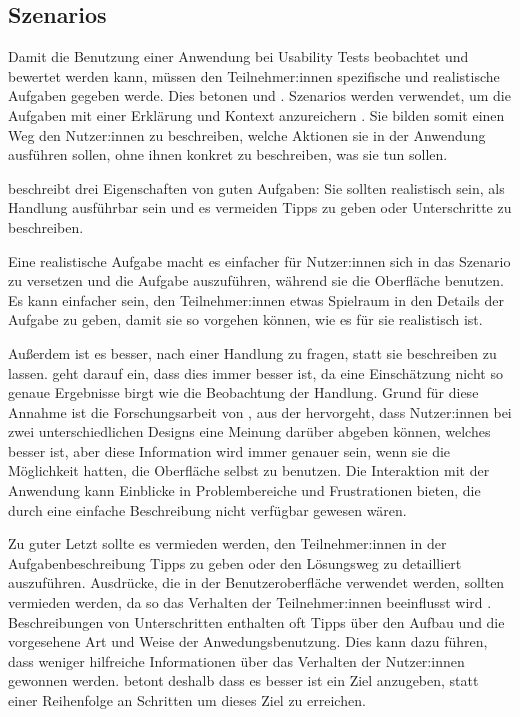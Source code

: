 \subsection{Szenarios}

Damit die Benutzung einer Anwendung bei Usability Tests beobachtet und bewertet werden kann, müssen
den Teilnehmer:innen spezifische und realistische Aufgaben gegeben werde. Dies betonen
\textcite{mccloskeyTaskScenarios2014} und \textcite{barnumUsabilityTesting2021}. Szenarios werden
verwendet, um die Aufgaben mit einer Erklärung und Kontext anzureichern
\parencite{mccloskeyTaskScenarios2014}. Sie bilden somit einen Weg den Nutzer:innen zu beschreiben,
welche Aktionen sie in der Anwendung ausführen sollen, ohne ihnen konkret zu beschreiben, was sie
tun sollen.

\textcite{mccloskeyTaskScenarios2014} beschreibt drei Eigenschaften von guten Aufgaben: Sie sollten
realistisch sein, als Handlung ausführbar sein und es vermeiden Tipps zu geben oder Unterschritte zu
beschreiben.

Eine realistische Aufgabe macht es einfacher für Nutzer:innen sich in das Szenario zu versetzen und
die Aufgabe auszuführen, während sie die Oberfläche benutzen. Es kann einfacher sein, den
Teilnehmer:innen etwas Spielraum in den Details der Aufgabe zu geben, damit sie so vorgehen können,
wie es für sie realistisch ist.
\parencite{mccloskeyTaskScenarios2014}

Außerdem ist es besser, nach einer Handlung zu fragen, statt sie beschreiben zu lassen.
\textcite{nielsenFirstRule2001} geht darauf ein, dass dies immer besser ist, da eine Einschätzung
nicht so genaue Ergebnisse birgt wie die Beobachtung der Handlung. Grund für diese Annahme ist die
Forschungsarbeit von \textcite{nielsenMeasuringUsability1994}, aus der hervorgeht, dass Nutzer:innen
bei zwei unterschiedlichen Designs eine Meinung darüber abgeben können, welches besser ist, aber
diese Information wird immer genauer sein, wenn sie die Möglichkeit hatten, die Oberfläche selbst zu
benutzen. Die Interaktion mit der Anwendung kann Einblicke in Problembereiche und Frustrationen
bieten, die durch eine einfache Beschreibung nicht verfügbar gewesen wären.
\parencite{mccloskeyTaskScenarios2014} 

Zu guter Letzt sollte es vermieden werden, den Teilnehmer:innen in der Aufgabenbeschreibung Tipps zu
geben oder den Lösungsweg zu detailliert auszuführen. Ausdrücke, die in der Benutzeroberfläche
verwendet werden, sollten vermieden werden, da so das Verhalten der Teilnehmer:innen beeinflusst
wird \parencite{mccloskeyTaskScenarios2014, barnumUsabilityTesting2021}. Beschreibungen von
Unterschritten enthalten oft Tipps über den Aufbau und die vorgesehene Art und Weise der
Anwedungsbenutzung. Dies kann dazu führen, dass weniger hilfreiche Informationen über das Verhalten
der Nutzer:innen gewonnen werden. \textcite{barnumUsabilityTesting2021} betont deshalb dass es
besser ist ein Ziel anzugeben, statt einer Reihenfolge an Schritten um dieses Ziel zu erreichen.
\parencite{mccloskeyTaskScenarios2014}

